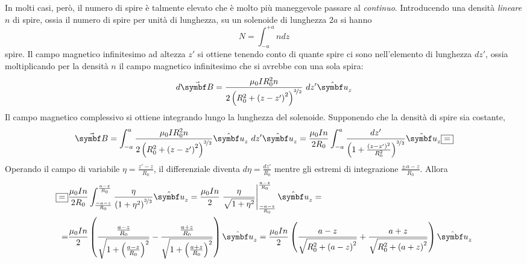 		In molti casi, però, il numero di spire è talmente elevato che è molto più maneggevole passare al \textit{continuo}. Introducendo una densità \textit{lineare} $n$ di spire, ossia il numero di spire per unità di lunghezza, su un solenoide di lunghezza $2a$ si hanno
		\begin{equation*}
			N=\int_{-a}^{+a}ndz
		\end{equation*}
		spire. Il campo magnetico infinitesimo ad altezza $z'$ si ottiene tenendo conto di quante spire ci sono nell'elemento di lunghezza $dz'$, ossia moltiplicando per la densità $n$ il campo magnetico infinitesimo che si avrebbe con una sola spira:
		\begin{equation*}
			d\vba{B}=\frac{\mu_0 I R_0^2 n}{2\left(R_0^2+\left(z-z'\right)^2\right)^{\nicefrac{3}{2}}}\ dz'\vbh{u}_z
		\end{equation*}
		Il campo magnetico complessivo si ottiene integrando lungo la lunghezza del solenoide. Supponendo che la densità di spire sia costante,
		\begin{equation*}
			\vba{B}=\int_{-a}^{a}\frac{\mu_0 I R_0^2 n}{2\left(R_0^2+\left(z-z'\right)^2\right)^{\nicefrac{3}{2}}}\vbh{u}_z\ dz'\vbh{u}_z=
			\frac{\mu_0 I n}{2R_0}\int_{-a}^{a}\frac{dz'}{\left(1+\frac{\left(z-z'\right)^2}{R_0^2}\right)^{\nicefrac{3}{2}}}\vbh{u}_z\squarequal
		\end{equation*}
		Operando il campo di variabile $\eta=\frac{z'-z}{R_0}$, il differenziale diventa $d\eta=\frac{dz'}{R_0}$ mentre gli estremi di integrazione $\frac{\pm a-z}{R_0}$. Allora
		\begin{align*}
			\squarequal&\displaystyle\frac{\mu_0 I n}{2R_0}\int_{\frac{-a-z}{R_0}}^{\frac{a-z}{R_0}}\frac{\eta}{\left(1+\eta^2\right)^{\nicefrac{3}{2}}}\vbh{u}_z=\frac{\mu_0 I n}{2}\eval{\frac{\eta}{\sqrt{1+\eta^2}}}_{\frac{-a-z}{R_0}}^{\frac{a-z}{R_0}}\vbh{u}_z=\\
			=&\displaystyle\frac{\mu_0 I n}{2}\left(\frac{\frac{a-z}{R_0}}{\sqrt{1+\left(\frac{a-z}{R_0}\right)^2}}-\frac{\frac{a+z}{R_0}}{\sqrt{1+\left(\frac{a+z}{R_0}\right)^2}}\right)\vbh{u}_z=
			\frac{\mu_0 I n}{2}\left(\frac{a-z}{\sqrt{R_0^2+\left(a-z\right)^2}}+\frac{a+z}{\sqrt{R_0^2+\left(a+z\right)^2}}\right)\vbh{u}_z
		\end{align*}
